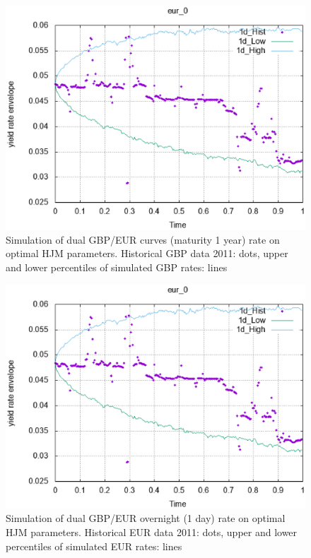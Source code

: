 \documentclass[10pt]{article}
\begin{document}
\begin{figure}[H]
\centering
\includegraphics [width=1\textwidth]{blank.eps}
\caption{Simulation of dual GBP/EUR curves (maturity 1 year) rate on optimal HJM parameters. Historical GBP data 2011: dots, upper and lower percentiles of simulated GBP rates: lines}
\label{gbp2d}
\end{figure}

\begin{figure}[H]
\centering
\includegraphics [width=1\textwidth]{blank.eps}
\caption{Simulation of dual GBP/EUR overnight (1 day) rate on optimal HJM parameters. Historical EUR data 2011: dots, upper and lower percentiles of simulated EUR rates: lines}
\label{eur0d}
\end{figure}
\end{document}
